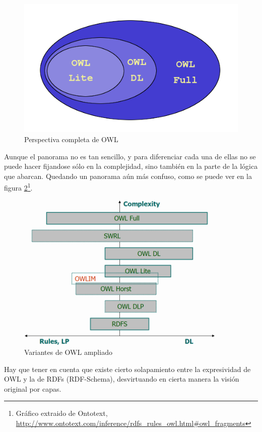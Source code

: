 \begin{figure}[tp]
	\centering
	\includegraphics[width=12cm]{images/owl-variants.png}
	\caption{Perspectiva completa de OWL}
	\label{fig:owlVariants}
\end{figure}

Aunque el panorama no es tan sencillo, y para diferenciar cada una de ellas no
se puede hacer fijandose sólo en la complejidad, sino también en la parte de la 
lógica que abarcan. Quedando un panorama aún más confuso, como se puede ver en 
la figura \ref{fig:owlVariantsExtended}\footnote{Gráfico extraido de Ontotext, 
\url{http://www.ontotext.com/inference/rdfs_rules_owl.html#owl_fragments}}.

\begin{figure}[tp]
	\centering
	\includegraphics[width=10cm]{images/owl-dialects.png}
	\caption{Variantes de OWL ampliado}
	\label{fig:owlVariantsExtended}
\end{figure}

Hay que tener en cuenta que existe cierto solapamiento entre la expresividad de
OWL y la de RDFs (RDF-Schema), desvirtuando en cierta manera la visión original
por capas.

